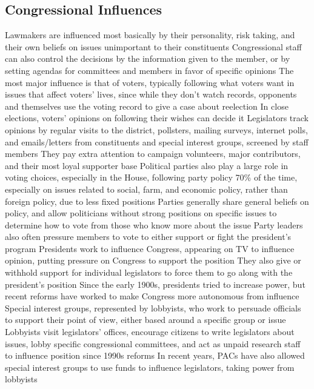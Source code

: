 \documentclass[11 pt, twoside]{article}
\newenvironment{outline*}
{
	\begin{outline}[enumerate]
	}
	{\end{outline}
}
\begin{document}
\subsection{Congressional Influences}
\begin{outline*}
\1 Lawmakers are influenced most basically by their personality, risk taking, and their own beliefs on issues unimportant to their constituents
\2 Congressional staff can also control the decisions by the information given to the member, or by setting agendas for committees and members in favor of specific opinions
\1 The most major influence is that of voters, typically following what voters want in issues that affect voters’ lives, since while they don’t watch records, opponents and themselves use the voting record to give a case about reelection
\2 In close elections, voters’ opinions on following their wishes can decide it
\2 Legislators track opinions by regular visits to the district, pollsters, mailing surveys, internet polls, and emails/letters from constituents and special interest groups, screened by staff members
\2 They pay extra attention to campaign volunteers, major contributors, and their most loyal supporter base
\1 Political parties also play a large role in voting choices, especially in the House, following party policy 70\% of the time, especially on issues related to social, farm, and economic policy, rather than foreign policy, due to less fixed positions
\2 Parties generally share general beliefs on policy, and allow politicians without strong positions on specific issues to determine how to vote from those who know more about the issue
\2 Party leaders also often pressure members to vote to either support or fight the president’s program
\1 Presidents work to influence Congress, appearing on TV to influence opinion, putting pressure on Congress to support the position
\2 They also give or withhold support for individual legislators to force them to go along with the president's position
\2 Since the early 1900s, presidents tried to increase power, but recent reforms have worked to make Congress more autonomous from influence
\1 Special interest groups, represented by lobbyists, who work to persuade officials to support their point of view, either based around a specific group or issue
\2 Lobbyists visit legislators’ offices, encourage citizens to write legislators about issues, lobby specific congressional committees, and act as unpaid research staff to influence position since 1990s reforms
\2 In recent years, PACs have also allowed special interest groups to use funds to influence legislators, taking power from lobbyists
\end{outline*}
\end{document}
